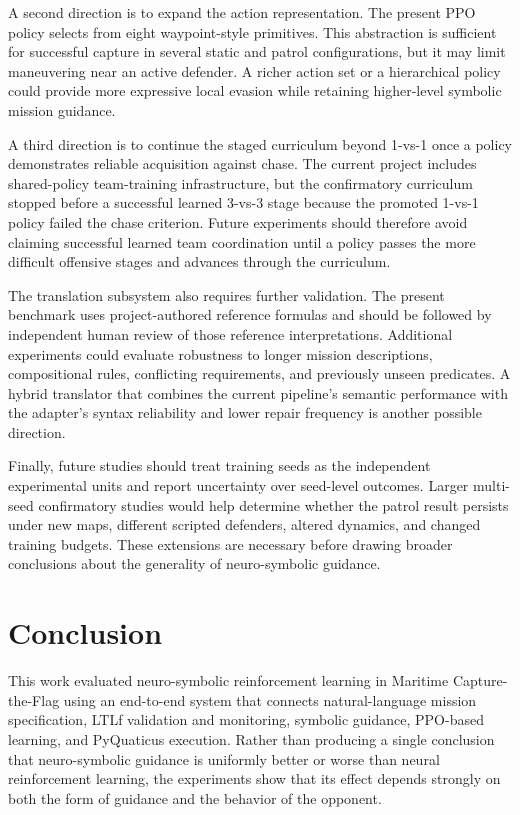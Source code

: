 \documentclass[letterpaper]{article}
\begin{document}
A second direction is to expand the action representation. The present PPO policy selects from eight waypoint-style primitives. This abstraction is sufficient for successful capture in several static and patrol configurations, but it may limit maneuvering near an active defender. A richer action set or a hierarchical policy could provide more expressive local evasion while retaining higher-level symbolic mission guidance.

A third direction is to continue the staged curriculum beyond 1-vs-1 once a policy demonstrates reliable acquisition against chase. The current project includes shared-policy team-training infrastructure, but the confirmatory curriculum stopped before a successful learned 3-vs-3 stage because the promoted 1-vs-1 policy failed the chase criterion. Future experiments should therefore avoid claiming successful learned team coordination until a policy passes the more difficult offensive stages and advances through the curriculum.

The translation subsystem also requires further validation. The present benchmark uses project-authored reference formulas and should be followed by independent human review of those reference interpretations. Additional experiments could evaluate robustness to longer mission descriptions, compositional rules, conflicting requirements, and previously unseen predicates. A hybrid translator that combines the current pipeline's semantic performance with the adapter's syntax reliability and lower repair frequency is another possible direction.

Finally, future studies should treat training seeds as the independent experimental units and report uncertainty over seed-level outcomes. Larger multi-seed confirmatory studies would help determine whether the patrol result persists under new maps, different scripted defenders, altered dynamics, and changed training budgets. These extensions are necessary before drawing broader conclusions about the generality of neuro-symbolic guidance.

\section{Conclusion}

This work evaluated neuro-symbolic reinforcement learning in Maritime Capture-the-Flag using an end-to-end system that connects natural-language mission specification, LTLf validation and monitoring, symbolic guidance, PPO-based learning, and PyQuaticus execution. Rather than producing a single conclusion that neuro-symbolic guidance is uniformly better or worse than neural reinforcement learning, the experiments show that its effect depends strongly on both the form of guidance and the behavior of the opponent.
\end{document}

